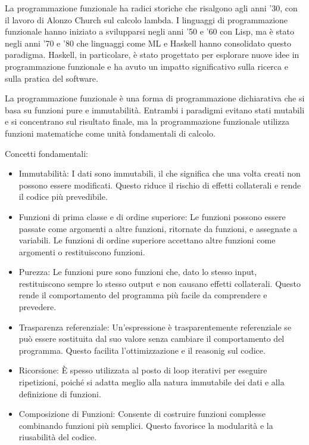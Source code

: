 \documentclass[
  letterpaper,
]{scrbook}
\providecommand{\tightlist}{%
  \setlength{\itemsep}{0pt}\setlength{\parskip}{0pt}}\usepackage{longtable,booktabs,array}
\begin{document}
La programmazione funzionale ha radici storiche che risalgono agli anni
'30, con il lavoro di Alonzo Church sul calcolo lambda. I linguaggi di
programmazione funzionale hanno iniziato a svilupparsi negli anni '50 e
'60 con Lisp, ma è stato negli anni '70 e '80 che linguaggi come ML e
Haskell hanno consolidato questo paradigma. Haskell, in particolare, è
stato progettato per esplorare nuove idee in programmazione funzionale e
ha avuto un impatto significativo sulla ricerca e sulla pratica del
software.

La programmazione funzionale è una forma di programmazione dichiarativa
che si basa su funzioni pure e immutabilità. Entrambi i paradigmi
evitano stati mutabili e si concentrano sul risultato finale, ma la
programmazione funzionale utilizza funzioni matematiche come unità
fondamentali di calcolo.

Concetti fondamentali:

\begin{itemize}
\tightlist
\item
  Immutabilità: I dati sono immutabili, il che significa che una volta
  creati non possono essere modificati. Questo riduce il rischio di
  effetti collaterali e rende il codice più prevedibile.
\item
  Funzioni di prima classe e di ordine superiore: Le funzioni possono
  essere passate come argomenti a altre funzioni, ritornate da funzioni,
  e assegnate a variabili. Le funzioni di ordine superiore accettano
  altre funzioni come argomenti o restituiscono funzioni.
\item
  Purezza: Le funzioni pure sono funzioni che, dato lo stesso input,
  restituiscono sempre lo stesso output e non causano effetti
  collaterali. Questo rende il comportamento del programma più facile da
  comprendere e prevedere.
\item
  Trasparenza referenziale: Un'espressione è trasparentemente
  referenziale se può essere sostituita dal suo valore senza cambiare il
  comportamento del programma. Questo facilita l'ottimizzazione e il
  reasonig sul codice.
\item
  Ricorsione: È spesso utilizzata al posto di loop iterativi per
  eseguire ripetizioni, poiché si adatta meglio alla natura immutabile
  dei dati e alla definizione di funzioni.
\item
  Composizione di Funzioni: Consente di costruire funzioni complesse
  combinando funzioni più semplici. Questo favorisce la modularità e la
  riusabilità del codice.
\end{itemize}
\end{document}
